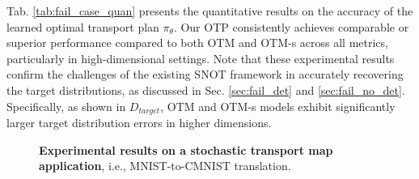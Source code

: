 Tab. \ref{tab:fail_case_quan} presents the quantitative results on the accuracy of the learned optimal transport plan $\pi_{\theta}$. Our OTP consistently achieves comparable or superior performance compared to both OTM and OTM-s across all metrics, particularly in high-dimensional settings. Note that these experimental results confirm the challenges of the existing SNOT framework in accurately recovering the target distributions, as discussed in Sec. \ref{sec:fail_det} and \ref{sec:fail_no_det}. Specifically, as shown in $D_{target}$, OTM and OTM-s models exhibit significantly larger target distribution errors in higher dimensions.


\begin{figure*}[t]
    \begin{minipage}{.43\linewidth}
        \centering
        \vspace{-10pt}
        \caption{\textbf{Experimental results on a stochastic transport map application}, i.e., MNIST-to-CMNIST translation.}


\end{minipage}
\end{figure*}
